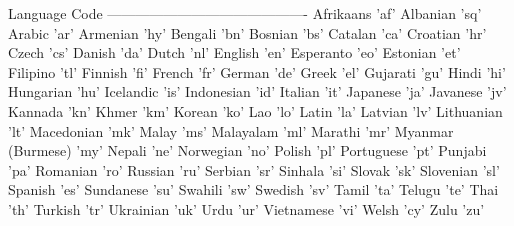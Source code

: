 Language            Code
-------------------------------------------
Afrikaans           'af'
Albanian            'sq'
Arabic              'ar'
Armenian            'hy'
Bengali             'bn'
Bosnian             'bs'
Catalan             'ca'
Croatian            'hr'
Czech               'cs'
Danish              'da'
Dutch               'nl'
English             'en' 
Esperanto           'eo'
Estonian            'et'
Filipino            'tl'
Finnish             'fi'
French              'fr'
German              'de'
Greek               'el'
Gujarati            'gu'
Hindi               'hi'
Hungarian           'hu'
Icelandic           'is'
Indonesian          'id'
Italian             'it'
Japanese            'ja'
Javanese            'jv'
Kannada             'kn'
Khmer               'km'
Korean              'ko'
Lao                 'lo'
Latin               'la'
Latvian             'lv'
Lithuanian          'lt'
Macedonian          'mk'
Malay               'ms'
Malayalam           'ml'
Marathi             'mr'
Myanmar (Burmese)   'my'
Nepali              'ne'
Norwegian           'no'
Polish              'pl'
Portuguese          'pt'
Punjabi             'pa'
Romanian            'ro'
Russian             'ru'
Serbian             'sr'
Sinhala             'si'
Slovak              'sk'
Slovenian           'sl'
Spanish             'es'
Sundanese           'su'
Swahili             'sw'
Swedish             'sv'
Tamil               'ta'
Telugu              'te'
Thai                'th'
Turkish             'tr'
Ukrainian           'uk'
Urdu                'ur'
Vietnamese          'vi'
Welsh               'cy'
Zulu                'zu'
